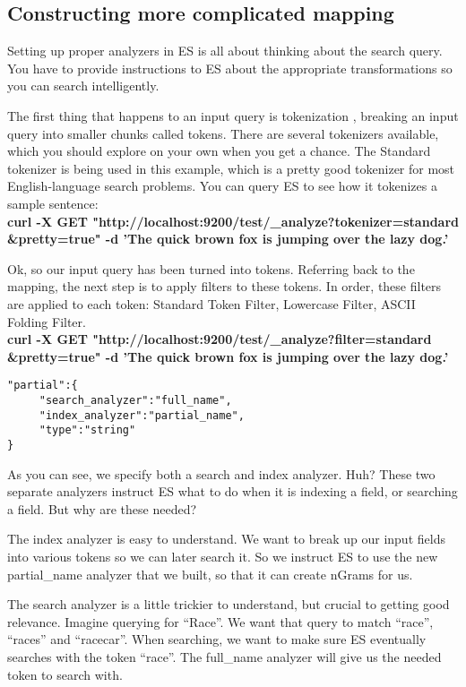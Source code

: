 \subsection{Constructing more complicated mapping}
\par Setting up proper analyzers in ES is all about thinking about the search query. You have to provide instructions to ES about the appropriate transformations so you can search intelligently.
\par The first thing that happens to an input query is tokenization , breaking an input query into smaller chunks called tokens. There are several tokenizers available, which you should explore on your own when you get a chance. The Standard tokenizer is being used in this example, which is a pretty good tokenizer for most English-language search problems. You can query ES to see how it tokenizes a sample sentence:\\
\textbf{curl -X GET "http://localhost:9200/test/\_analyze?tokenizer=standard\\\&pretty=true" -d 'The quick brown fox is jumping over the lazy dog.'}
\par Ok, so our input query has been turned into tokens. Referring back to the mapping, the next step is to apply filters to these tokens. In order, these filters are applied to each token: Standard Token Filter, Lowercase Filter, ASCII Folding Filter.\\
\textbf{curl -X GET "http://localhost:9200/test/\_analyze?filter=standard\\\&pretty=true" -d 'The quick brown fox is jumping over the lazy dog.'}
\begin{verbatim}
"partial":{
     "search_analyzer":"full_name",
     "index_analyzer":"partial_name",
     "type":"string"
}
\end{verbatim}
\par As you can see, we specify both a search and index analyzer. Huh? These two separate analyzers instruct ES what to do when it is indexing a field, or searching a field. But why are these needed?
\par The index analyzer is easy to understand. We want to break up our input fields into various tokens so we can later search it. So we instruct ES to use the new partial\_name analyzer that we built, so that it can create nGrams for us.
\par The search analyzer is a little trickier to understand, but crucial to getting good relevance. Imagine querying for “Race”. We want that query to match “race”, “races” and “racecar”. When searching, we want to make sure ES eventually searches with the token “race”. The full\_name analyzer will give us the needed token to search with.
